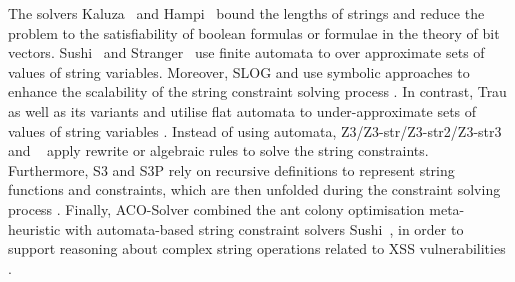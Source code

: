 The solvers Kaluza~\cite{Berkeley-JavaScript} and Hampi~\cite{HAMPI}  bound the lengths of strings and reduce the problem to the satisfiability of boolean formulas or formulae in the theory of bit vectors. Sushi~\cite{sushi} and Stranger~\cite{YABI14,Stranger} use finite automata to over approximate sets of values of string variables. Moreover, SLOG and {\slent}  use symbolic approaches to enhance the scalability of the string constraint solving process \cite{fang-yu-circuits,WC+18}. In contrast, Trau as well as its variants {\zthreetrau} and {\trauplus} utilise flat automata to under-approximate sets of values of string variables \cite{Abdulla17,AbdullaACDHRR18-trau,AbdullaA+19,Z3-trau}.
%
Instead of using automata, Z3/Z3-str/Z3-str2/Z3-str3~\cite{BTV09,Z3,Z3-str,Z3-str2,Z3-str3} and {\cvc}~\cite{cvc4,ReynoldsWBBLT17} apply rewrite or algebraic rules to solve the string constraints.
%
Furthermore, S3 and S3P rely on recursive definitions to represent string functions and constraints, which are then unfolded during the constraint solving process \cite{S3,TCJ16}.
%
Finally, ACO-Solver combined the ant colony optimisation meta-heuristic with automata-based string constraint solvers Sushi~\cite{sushi},  in order to support reasoning about complex string operations related to XSS vulnerabilities \cite{ThomeSBB17}.
%


